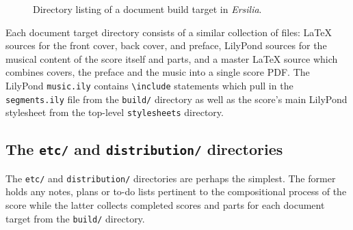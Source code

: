 \begin{figure}[h!]
\begin{singlespacing}
\vspace{-0.5\baselineskip}
\end{singlespacing}
\caption{Directory listing of a document build target in \emph{Ersilia}.}
\end{figure}

Each document target directory consists of a similar collection of files: LaTeX
sources for the front cover, back cover, and preface, LilyPond sources for the
musical content of the score itself and parts, and a master LaTeX source which
combines covers, the preface and the music into a single score PDF. The
LilyPond \texttt{music.ily} contains \texttt{\textbackslash{}include}
statements which pull in the \texttt{segments.ily} file from the
\texttt{build/} directory as well as the score's main LilyPond stylesheet from
the top-level \texttt{stylesheets} directory.

\subsection{The \texttt{etc/} and \texttt{distribution/} directories}
\label{ssec:the-etc-and-distribution-directories}

The \texttt{etc/} and \texttt{distribution/} directories are perhaps the
simplest. The former holds any notes, plans or to-do lists pertinent to the
compositional process of the score while the latter collects completed scores
and parts for each document target from the \texttt{build/} directory.

